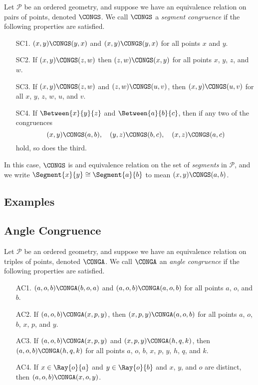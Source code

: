 \documentclass{article}
\begin{document}

\begin{dfn}
Let $\mathcal{P}$ be an ordered geometry, and suppose we have an equivalence relation on pairs of points, denoted $\CONGS$. We call $\CONGS$ a \emph{segment congruence} if the following properties are satisfied.
\begin{itemize}
\item[SC1.] $(x,y) \CONGS (y,x)$ and $(x,y) \CONGS (y,x)$ for all points $x$ and $y$.
\item[SC2.] If $(x,y) \CONGS (z,w)$ then $(z,w) \CONGS (x,y)$ for all points $x$, $y$, $z$, and $w$.
\item[SC3.] If $(x,y) \CONGS (z,w)$ and $(z,w) \CONGS (u,v)$, then $(x,y) \CONGS (u,v)$ for all $x$, $y$, $z$, $w$, $u$, and $v$.
\item[SC4.] If $\Between{x}{y}{z}$ and $\Between{a}{b}{c}$, then if any two of the congruences \[ (x,y) \CONGS (a,b), \quad (y,z) \CONGS (b,c), \quad (x,z) \CONGS (a,c) \] hold, so does the third.
\end{itemize}

In this case, $\CONGS$ is and equivalence relation on the set of \emph{segments} in $\mathcal{P}$, and we write $\Segment{x}{y} \cong \Segment{a}{b}$ to mean $(x,y) \CONGS (a,b)$.
\end{dfn}

\subsection*{Examples}


\subsection*{Angle Congruence}

\begin{dfn}
Let $\mathcal{P}$ be an ordered geometry, and suppose we have an equivalence relation on triples of points, denoted $\CONGA$. We call $\CONGA$ an \emph{angle congruence} if the following properties are satisfied.
\begin{itemize}
\item[AC1.] $(a,o,b) \CONGA (b,o,a)$ and $(a,o,b) \CONGA (a,o,b)$ for all points $a$, $o$, and $b$.
\item[AC2.] If $(a,o,b) \CONGA (x,p,y)$, then $(x,p,y) \CONGA (a,o,b)$ for all points $a$, $o$, $b$, $x$, $p$, and $y$.
\item[AC3.] If $(a,o,b) \CONGA (x,p,y)$ and $(x,p,y) \CONGA (h,q,k)$, then $(a,o,b) \CONGA (h,q,k)$ for all points $a$, $o$, $b$, $x$, $p$, $y$, $h$, $q$, and $k$.
\item[AC4.] If $x \in \Ray{o}{a}$ and $y \in \Ray{o}{b}$ and $x$, $y$, and $o$ are distinct, then $(a,o,b) \CONGA (x,o,y)$.
\end{itemize}
\end{dfn}
\end{document}
